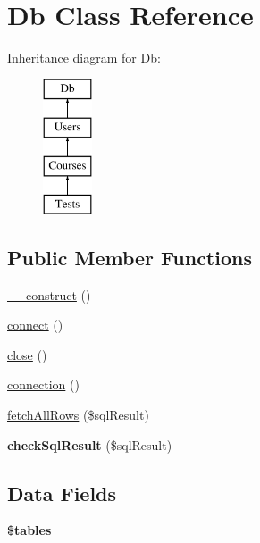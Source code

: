 \hypertarget{class_db}{\section{Db Class Reference}
\label{class_db}
}
Inheritance diagram for Db\-:\begin{figure}[H]
\begin{center}
\leavevmode
\includegraphics[height=4.000000cm]{class_db}
\end{center}
\end{figure}
\subsection*{Public Member Functions}
\begin{DoxyCompactItemize}
\item 
\hyperlink{class_db_a095c5d389db211932136b53f25f39685}{\-\_\-\-\_\-construct} ()
\item 
\hyperlink{class_db_a78572828d11dcdf2a498497d9001d557}{connect} ()
\item 
\hyperlink{class_db_aa69c8bf1f1dcf4e72552efff1fe3e87e}{close} ()
\item 
\hyperlink{class_db_a7fa48f6882eccec91ea9c433e1ad2a57}{connection} ()
\item 
\hyperlink{class_db_a528ec08d78133851fec5e71ed9cf3779}{fetch\-All\-Rows} (\$sql\-Result)
\item 
\hypertarget{class_db_a79f742455432acb343b7ebed6013995f}{{\bfseries check\-Sql\-Result} (\$sql\-Result)}\label{class_db_a79f742455432acb343b7ebed6013995f}

\end{DoxyCompactItemize}
\subsection*{Data Fields}
\begin{DoxyCompactItemize}
\item 
\hypertarget{class_db_a3d332a3c374a53802495dcb045f6133f}{{\bfseries \$tables}}\label{class_db_a3d332a3c374a53802495dcb045f6133f}

\end{DoxyCompactItemize}

